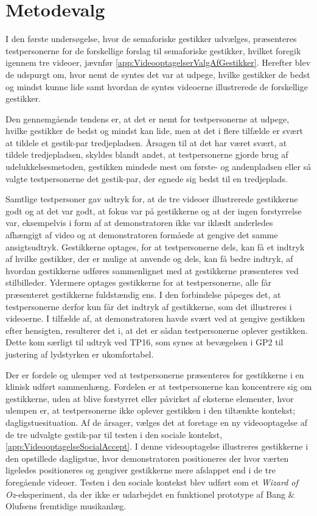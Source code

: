 \section{Metodevalg}
\label{DiskussionMetodevalg}
%
I den første undersøgelse, hvor de semaforiske gestikker udvælges, præsenteres testpersonerne for de forskellige forslag til semaforiske gestikker, hvilket foregik igennem tre videoer, jævnfør \autoref{app:VideooptagelserValgAfGestikker}. Herefter blev de udspurgt om, hvor nemt de syntes det var at udpege, hvilke gestikker de bedst og mindst kunne lide samt hvordan de syntes videoerne illustrerede de forskellige gestikker.

Den gennemgående tendens er, at det er nemt for testpersonerne at udpege, hvilke gestikker de bedst og mindst kan lide, men at det i flere tilfælde er svært at tildele et gestik-par tredjepladsen. Årsagen til at det har været svært, at tildele tredjepladsen, skyldes blandt andet, at testpersonerne gjorde brug af udelukkelsesmetoden, gestikken mindede mest om første- og andenpladsen eller så valgte testpersonerne det gestik-par, der egnede sig bedst til en tredjeplads. 

Samtlige testpersoner gav udtryk for, at de tre videoer illustrerede gestikkerne godt og at det var godt, at fokus var på gestikkerne og at der ingen forstyrrelse var, eksempelvis i form af at demonstratoren ikke var iklædt anderledes afhængigt af video og at demonstratoren formåede at gengive det samme ansigtsudtryk. Gestikkerne optages, for at testpersonerne dels, kan få et indtryk af hvilke gestikker, der er mulige at anvende og dels, kan få bedre indtryk, af hvordan gestikkerne udføres sammenlignet med at gestikkerne præsenteres ved stilbilleder. Ydermere optages gestikkerne for at testpersonerne, alle får præsenteret gestikkerne fuldstændig ens. I den forbindelse påpeges det, at testpersonerne derfor kun får det indtryk af gestikkerne, som det illustreres i videoerne. I tilfælde af, at demonstratoren havde svært ved at gengive gestikken efter hensigten, resulterer det i, at det er sådan testpersonerne oplever gestikken. Dette kom særligt til udtryk ved TP16, som synes at bevægelsen i GP2 til justering af lydstyrken er ukomfortabel. 

Der er fordele og ulemper ved at testpersonerne præsenteres for gestikkerne i en klinisk udført sammenhæng. Fordelen er at testpersonerne kan koncentrere sig om gestikkerne, uden at blive forstyrret eller påvirket af eksterne elementer, hvor ulempen er, at testpersonerne ikke oplever gestikken i den tiltænkte kontekst; dagligstuesituation. Af de årsager, vælges det at foretage en ny videooptagelse af de tre udvalgte gestik-par til testen i den sociale kontekst, \autoref{app:VideooptagelseSocialAccept}. I denne videooptagelse illustreres gestikkerne i den opstillede dagligstue, hvor demonstratoren positioneres der hvor værten ligeledes positioneres og gengiver gestikkerne mere afslappet end i de tre foregående videoer.\blankline 
%
Testen i den sociale kontekst blev udført som et \textit{Wizard of Oz}-eksperiment, da der ikke er udarbejdet en funktionel prototype af Bang $\&$ Olufsens fremtidige musikanlæg. 


